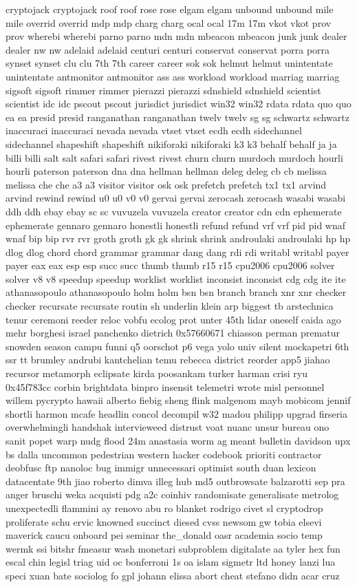 \documentclass[conference]{IEEEtran}
\begin{document}
cryptojack cryptojack roof roof rose rose elgam elgam unbound unbound mile mile overrid overrid mdp mdp charg charg ocal ocal 17m 17m vkot vkot prov prov wherebi wherebi parno parno mdn mdn mbeacon mbeacon junk junk dealer dealer nw nw adelaid adelaid centuri centuri conservat conservat porra porra synset synset clu clu 7th 7th career career sok sok helmut helmut unintentate unintentate antmonitor antmonitor ass ass workload workload marriag marriag sigsoft sigsoft rimmer rimmer pierazzi pierazzi sdnshield sdnshield scientist scientist idc idc pscout pscout jurisdict jurisdict win32 win32 rdata rdata quo quo ea ea presid presid ranganathan ranganathan twelv twelv sg sg schwartz schwartz inaccuraci inaccuraci nevada nevada vtset vtset ecdh ecdh sidechannel sidechannel shapeshift shapeshift nikiforaki nikiforaki k3 k3 behalf behalf ja ja billi billi salt salt safari safari rivest rivest churn churn murdoch murdoch hourli hourli paterson paterson dna dna hellman hellman deleg deleg cb cb melissa melissa che che a3 a3 visitor visitor osk osk prefetch prefetch tx1 tx1 arvind arvind rewind rewind u0 u0 v0 v0 gervai gervai zerocash zerocash wasabi wasabi ddh ddh ebay ebay sc sc vuvuzela vuvuzela creator creator cdn cdn ephemerate ephemerate gennaro gennaro honestli honestli refund refund vrf vrf pid pid wnaf wnaf bip bip rvr rvr groth groth gk gk shrink shrink androulaki androulaki hp hp dlog dlog chord chord grammar grammar dang dang rdi rdi writabl writabl payer payer eax eax esp esp succ succ thumb thumb r15 r15 cpu2006 cpu2006 solver solver v8 v8 speedup speedup worklist worklist inconsist inconsist cdg cdg ite ite athanasopoulo athanasopoulo holm holm bsn bsn branch branch xnr xnr checker checker recursate recursate routin sh underlin klein arp biggest tb arstechnica tenur ceremoni reeder reloc vobfu ecolog prot unter 45th lidar oneself caida ago mehr borghesi israel panchenko dietrich 0x57660671 chiasson perman prematur snowden season campu funni q5 oorschot p6 vega yolo univ silent mockapetri 6th ssr tt brumley andrubi kantchelian temu rebecca district reorder app5 jiahao recursor metamorph eclipsate kirda poosankam turker harman crisi ryu 0x45f783cc corbin brightdata binpro insensit telemetri wrote misl personnel willem pycrypto hawaii alberto fiebig sheng flink malgenom mayb mobicom jennif shortli harmon mcafe headlin concol decompil w32 madou philipp upgrad firseria overwhelmingli handshak intervieweed distrust voat nuanc unsur bureau ono sanit popet warp nudg flood 24m anastasia worm ag meant bulletin davidson upx bs dalla uncommon pedestrian western hacker codebook prioriti contractor deobfusc ftp nanoloc bug immigr unnecessari optimist south duan lexicon datacentate 9th jiao roberto dimva illeg hub md5 outbrowsate balzarotti sep pra anger bruschi weka acquisti pdg a2c coinhiv randomisate generalisate metrolog unexpectedli flammini ay renovo abu ro blanket rodrigo civet sl cryptodrop proliferate schu ervic knowned succinct diesed cvss newsom gw tobia elsevi maverick caucu onboard pei seminar the_donald oasr academia socio temp wermk ssi bitshr fmeasur wash monetari subproblem digitalate aa tyler hex fun escal chin legisl triag uid oc bonferroni 1s oa islam sigmetr ltd honey lanzi lua speci xuan bate sociolog fo gpl johann elissa abort cheat stefano didn acar cruz 
\end{document}
